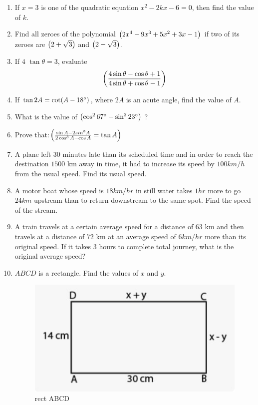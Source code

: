 \begin{enumerate}
\item If $x=3$ is one of the quadratic equation $x^2-2kx-6= 0$, then find the value of $k$.
			\item Find all zeroes of the polynomial $\left(2x^4-9x^3+5x^2+3x-1\right)$ if two of its zeroes are $\left(2+\sqrt3\right)$ and $\left(2-\sqrt3\right)$.

			\item If $4$ $\tan\theta=3$, evaluate \begin{align*}\left(\frac{4 \sin\theta - \cos\theta + 1 }{ 4 \sin\theta + \cos\theta - 1 } \right) \end{align*}   

\item If $\tan2A = \cot(A-18\degree)$, where $2A$ is an acute angle, find the value of $A$.

\item What is the value of $ \left(\cos^2 67\degree - \sin^2 23\degree\right)$ ?

\item  Prove that:$\left(\frac{\sin A - 2sin^3 A}{2 \cos^3 A-\cos A} = \tan A \right)$

	\item A plane left $30$ minutes late than its scheduled time and in order to reach the destination $1500$ km away in time, it had to increase  its speed by $100 km/h$ from the usual speed. Find its usual speed.

	\item A motor boat whose speed is $18  km/hr$ in still water takes $1hr$ more to go $24 km$ upstream than to return downstream to the same spot. Find the speed of the stream.
		\item A train travels at a certain average speed for a distance of $63$ km and then travels at a distance of $72$ km at an average speed of $6 km/hr$ more than its original speed. If it takes $3$ hours to complete total journey, what is the original average speed?

	\item $ABCD$ is a rectangle. Find the values of $x$ and $y$.
		\begin{figure}
		\centering
		\includegraphics[width=\columnwidth]{figs/rectq8.jpg}
		\caption{rect ABCD}
		\label{fig:Fig1}
\end{figure}

\end{enumerate}

